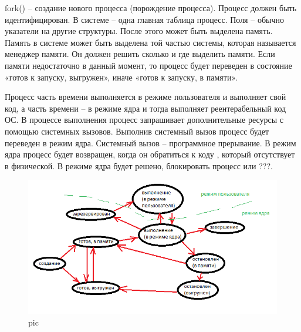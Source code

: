 fork() – создание нового процесса (порождение процесса). Процесс должен быть идентифицирован. В системе – одна главная таблица процесс. Поля – обычно указатели на другие структуры.  После этого может быть выделена память. Память в системе может быть выделена той частью системы, которая называется менеджер памяти. Он должен решить сколько и где выделить памяти. Если памяти недостаточно в данный момент, то процесс будет переведен в состояние «готов к запуску, выгружен», иначе «готов к запуску, в памяти».

Процесс часть времени выполняется в режиме пользователя и выполняет свой код, а часть времени – в режиме ядра и тогда выполняет реентерабельный код ОС. В процессе выполнения процесс запрашивает дополнительные ресурсы с помощью системных вызовов. Выполнив системный вызов процесс будет переведен в режим ядра. Системный вызов – программное прерывание. В режим ядра процесс будет возвращен, когда он обратиться к коду , который отсутствует в физической. В режиме ядра будет решено, блокировать процесс или ???.


\begin{figure}[H]
  \centering
  \includegraphics[width=\textwidth]{pic/2.png}
  \caption{pic}
\end{figure}

